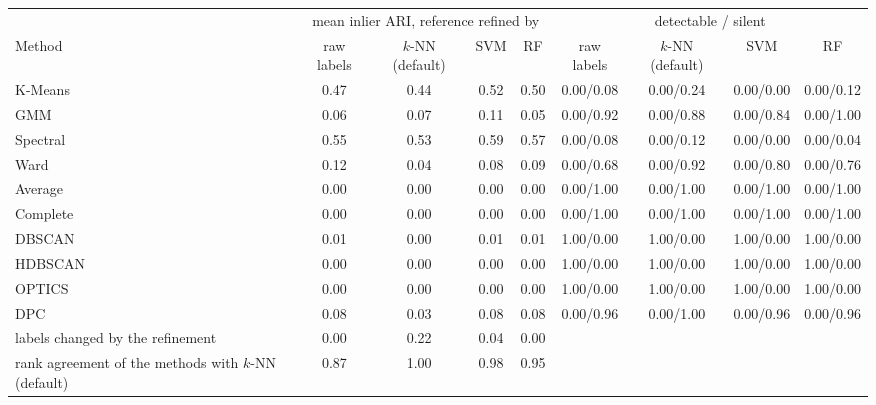 \begin{tabular}{@{}lcccccccc@{}}
\toprule
 & \multicolumn{4}{c}{mean inlier ARI, reference refined by} & \multicolumn{4}{c}{detectable / silent} \\
\cmidrule(lr){2-5}\cmidrule(lr){6-9}
Method & raw labels & $k$-NN (default) & SVM & RF & raw labels & $k$-NN (default) & SVM & RF \\
\midrule
K-Means & 0.47 & 0.44 & 0.52 & 0.50 & 0.00/0.08 & 0.00/0.24 & 0.00/0.00 & 0.00/0.12 \\
GMM & 0.06 & 0.07 & 0.11 & 0.05 & 0.00/0.92 & 0.00/0.88 & 0.00/0.84 & 0.00/1.00 \\
Spectral & 0.55 & 0.53 & 0.59 & 0.57 & 0.00/0.08 & 0.00/0.12 & 0.00/0.00 & 0.00/0.04 \\
Ward & 0.12 & 0.04 & 0.08 & 0.09 & 0.00/0.68 & 0.00/0.92 & 0.00/0.80 & 0.00/0.76 \\
Average & 0.00 & 0.00 & 0.00 & 0.00 & 0.00/1.00 & 0.00/1.00 & 0.00/1.00 & 0.00/1.00 \\
Complete & 0.00 & 0.00 & 0.00 & 0.00 & 0.00/1.00 & 0.00/1.00 & 0.00/1.00 & 0.00/1.00 \\
DBSCAN & 0.01 & 0.00 & 0.01 & 0.01 & 1.00/0.00 & 1.00/0.00 & 1.00/0.00 & 1.00/0.00 \\
HDBSCAN & 0.00 & 0.00 & 0.00 & 0.00 & 1.00/0.00 & 1.00/0.00 & 1.00/0.00 & 1.00/0.00 \\
OPTICS & 0.00 & 0.00 & 0.00 & 0.00 & 1.00/0.00 & 1.00/0.00 & 1.00/0.00 & 1.00/0.00 \\
DPC & 0.08 & 0.03 & 0.08 & 0.08 & 0.00/0.96 & 0.00/1.00 & 0.00/0.96 & 0.00/0.96 \\
\midrule
labels changed by the refinement & 0.00 & 0.22 & 0.04 & 0.00 &  &  &  &  \\
rank agreement of the methods with $k$-NN (default) & 0.87 & 1.00 & 0.98 & 0.95 &  &  &  &  \\
\bottomrule
\end{tabular}
